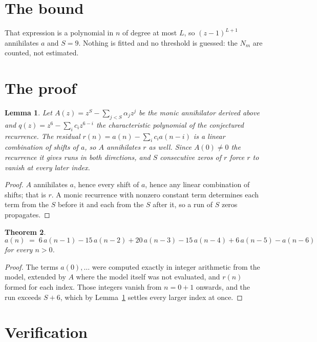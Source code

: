 \documentclass[11pt,a4paper]{article}
\theoremstyle{plain}
\newtheorem{theorem}{Theorem}
\newtheorem{lemma}[theorem]{Lemma}
\theoremstyle{definition}
\begin{document}
\section{The bound}

That expression is a polynomial in $n$ of degree at most $L$, so $(z-1)^{L+1}$ annihilates
$a$ and $S=9$. Nothing is fitted and no threshold is guessed: the $N_m$ are counted, not
estimated.

\section{The proof}

\begin{lemma}\label{lem:crit}
Let $A(z)=z^S-\sum_{j<S}\alpha_jz^{j}$ be the monic annihilator derived above and
$q(z)=z^{6}-\sum_ic_iz^{6-i}$ the characteristic polynomial of the conjectured
recurrence. The residual $r(n)=a(n)-\sum_ic_ia(n-i)$ is a linear combination of shifts of $a$,
so $A$ annihilates $r$ as well. Since $A(0)\ne0$ the recurrence it gives runs in both
directions, and $S$ consecutive zeros of $r$ force $r$ to vanish at every later index.
\end{lemma}

\begin{proof}
$A$ annihilates $a$, hence every shift of $a$, hence any linear combination of shifts; that is
$r$. A monic recurrence with nonzero constant term determines each term from the $S$ before it
and each from the $S$ after it, so a run of $S$ zeros propagates.
\end{proof}

\begin{theorem}
\[
a(n)\;=\;6\,a(n-1) - 15\,a(n-2) + 20\,a(n-3) - 15\,a(n-4) + 6\,a(n-5) - a(n-6)
\]
for every $n>0$.
\end{theorem}

\begin{proof}
The terms $a(0),\dots$ were computed exactly in integer arithmetic from the model, extended by
$A$ where the model itself was not evaluated, and $r(n)$ formed for each index. Those integers
vanish from $n=0+1$ onwards, and the run exceeds $S+6$, which by
Lemma~\ref{lem:crit} settles every larger index at once.
\end{proof}

\section{Verification}
\end{document}
